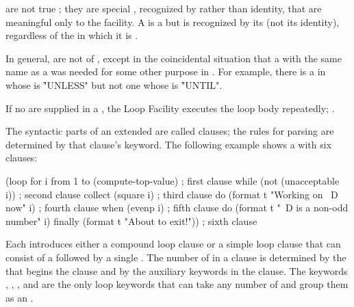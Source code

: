 
 are not true ; 
they are special , recognized by  rather than  identity,
that are meaningful only to the  facility.
A  is a  but is recognized by its 
(not its identity), regardless of the  in which it is .  

In general,  are not  of ,
except in the coincidental situation that a  with the same name as a
 was needed for some other purpose in \clisp.  For example,
there is a  in  whose  is \f{"UNLESS"} but
not one whose  is \f{"UNTIL"}.

If no  are supplied in a  ,
the Loop Facility executes the loop body repeatedly; \seesection\SimpleLoop.

\endsubsubsection%

 
The syntactic parts of an extended   are called clauses; 
the rules for parsing are determined by 
that clause's keyword.
The following example shows a   with six clauses:
 
\code
 (loop for i from 1 to (compute-top-value)       ; first clause
       while (not (unacceptable i))              ; second clause
       collect (square i)                        ; third clause
       do (format t "Working on ~D now" i)       ; fourth clause
       when (evenp i)                            ; fifth clause
         do (format t "~D is a non-odd number" i)
       finally (format t "About to exit!"))      ; sixth clause
\endcode
 
Each  introduces 
either a compound loop clause or a simple loop clause
that can consist of a  followed by a single .
The number of  in a clause is determined by the  
that begins the clause and by the auxiliary keywords in the clause.
The keywords , 
,
, and  
are the only loop keywords that can take any number of  and 
group them as an .

